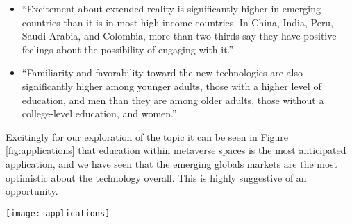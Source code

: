 \begin{itemize}
\item ``Excitement about extended reality is significantly higher in emerging countries than it is in most high-income countries. In China, India, Peru, Saudi Arabia, and Colombia, more than two-thirds say they have positive feelings about the possibility of engaging with it.''
\item ``Familiarity and favorability toward the new technologies are also significantly higher among younger adults, those with a higher level of education, and men than they are among older adults, those without a college-level education, and women.''
\end{itemize}

Excitingly for our exploration of the topic it can be seen in Figure \ref{fig:applications} that education within metaverse spaces is the most anticipated application, and we have seen that the emerging globals markets are the most optimistic about the technology overall. This is highly suggestive of an opportunity.

\begin{figure*}[ht]\centering %
	\texttt{[image: applications]}
	\caption{\href{https://www.ipsos.com/en/global-advisor-metaverse-extended-reality-may-2022}{IPSOS poll predicted applications}}
	\label{fig:applications}
\end{figure*}

